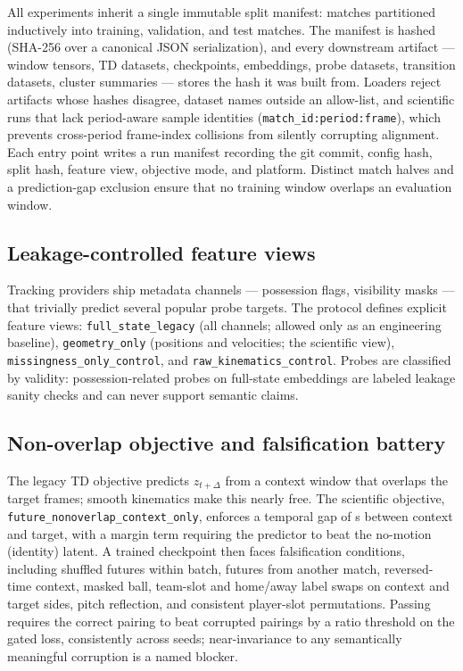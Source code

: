 \documentclass{article}
\begin{document}
All experiments inherit a single immutable split manifest: \NumMatches{}
matches partitioned inductively into \NumTrainMatches{} training,
\NumValMatches{} validation, and \NumTestMatches{} test matches. The manifest
is hashed (SHA-256 over a canonical JSON serialization), and every downstream
artifact --- window tensors, TD datasets, checkpoints, embeddings, probe
datasets, transition datasets, cluster summaries --- stores the hash it was
built from. Loaders reject artifacts whose hashes disagree, dataset names
outside an allow-list, and scientific runs that lack period-aware sample
identities (\texttt{match\_id:period:frame}), which prevents cross-period
frame-index collisions from silently corrupting alignment. Each entry point
writes a run manifest recording the git commit, config hash, split hash,
feature view, objective mode, and platform. Distinct match halves and a
prediction-gap exclusion ensure that no training window overlaps an
evaluation window.

\subsection{Leakage-controlled feature views}
\label{sec:protocol-views}

Tracking providers ship metadata channels --- possession flags, visibility
masks --- that trivially predict several popular probe targets. The protocol
defines explicit feature views: \texttt{full\_state\_legacy} (all channels;
allowed only as an engineering baseline), \texttt{geometry\_only} (positions
and velocities; the scientific view), \texttt{missingness\_only\_control}, and
\texttt{raw\_kinematics\_control}. Probes are classified by validity:
possession-related probes on full-state embeddings are labeled leakage sanity
checks and can never support semantic claims.

\subsection{Non-overlap objective and falsification battery}
\label{sec:protocol-falsification}

The legacy TD objective predicts $z_{t+\Delta}$ from a context window that
overlaps the target frames; smooth kinematics make this nearly free.
The scientific objective, \texttt{future\_nonoverlap\_context\_only},
enforces a temporal gap of \PredictionGapSeconds{}s between context and
target, with a margin term requiring the predictor to beat the no-motion
(identity) latent. A trained checkpoint then faces \FalsConditionCount{}
falsification conditions, including shuffled futures within batch, futures
from another match, reversed-time context, masked ball, team-slot and
home/away label swaps on context and target sides, pitch reflection, and
consistent player-slot permutations. Passing requires the correct pairing to
beat corrupted pairings by a ratio threshold on the gated loss, consistently
across seeds; near-invariance to any semantically meaningful corruption is a
named blocker.
\end{document}

